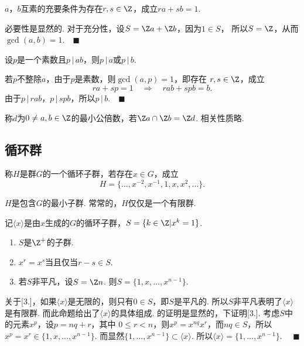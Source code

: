   \begin{cor}[互素]
    \label{cor: 互素}
    $a$，$b$互素的充要条件为存在$r,s\in\Z$，成立$ra+sb=1$.
  \end{cor}
  \proof
    必要性是显然的. 对于充分性，设$S=\Z a+\Z b$，因为$1\in S$，
    所以$S=\Z$，从而$\gcd(a, b)=1$.$\quad\blacksquare$

  \begin{cor}
    设$p$是一个素数且$p\,|\,ab$，则$p\,|\,a$或$p\,|\,b$.
  \end{cor}
  \proof
    若$p$不整除$a$，由于$p$是素数，则$\gcd(a,p)=1$，即存在
    $r,s\in\Z$，成立
    \[
      ra+sp = 1 \quad\Rightarrow\quad rab+spb=b.
    \]
    由于$p\,|\,rab$，$p\,|\,spb$，所以$p\,|\,b$.$\quad\blacksquare$

  \begin{defi}[最小公倍数]
    称$d$为$0\ne a,b\in\Z$的最小公倍数，若$\Z a\cap\Z b=\Z d$.
    相关性质略.
  \end{defi}

\subsection{循环群}

  \begin{defi}[循环子群]
    称$H$是群$G$的一个循环子群，若存在$x\in G$，成立
    \[
      H = \{\dots, x^{-2}, x^{-1}, 1, x, x^2, \dots\}.
    \]
  \end{defi}
  \remark
    $H$是包含$G$的最小子群. 常常的，$H$仅仅是一个有限群.

  \begin{thm}
    记$\langle x \rangle$是由$x$生成的$G$的循环子群，$S=\{k\in\Z | x^k=1\}$.
    \begin{enumerate}
      \item $S$是$\Z^+$的子群.
      \item $x^r = x^s$当且仅当$r-s\in S$.
      \item 若$S$非平凡，设$S=\Z n$. 则$S=\{1, x,\dots,x^{n-1}\}$.
    \end{enumerate}
  \end{thm}
  \remark
    关于[3.]，如果$\langle x\rangle$是无限的，则只有$0\in S$，即$S$是平凡的.
    所以$S$非平凡表明了$\langle x \rangle$是有限群. 而此命题给出了$\langle
    x\rangle$的具体组成.
  \proof
    [1. 2.]的证明是显然的，下证明[3.]. 考虑$S$中的元素$x^p$，设$p=nq+r$，其中
    $0\le r < n$，则$x^p = x^{nq}x^r$，而$nq\in S$，所以$x^p=x^r\in
    \{1,x,\dots, x^{n-1}\}$. 而显然$\{1,\dots,x^{n-1}\}\subset\langle
    x\rangle$. 所以$\langle x\rangle = \{1,\dots,x^{n-1}\}$.
    $\quad\blacksquare$

